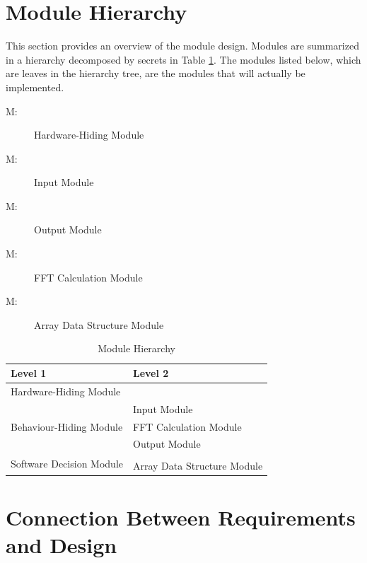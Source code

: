 \documentclass[12pt, titlepage]{article}
\newcounter{mnum}
\newcommand{\mthemnum}{M\themnum}
\begin{document}
\section{Module Hierarchy} \label{SecMH}

This section provides an overview of the module design. Modules are summarized
in a hierarchy decomposed by secrets in Table \ref{TblMH}. The modules listed
below, which are leaves in the hierarchy tree, are the modules that will
actually be implemented.

\begin{description}

\item [ \mthemnum \label{mHH}:] Hardware-Hiding Module
\item [ \mthemnum \label{mInput}:] Input  Module
\item [ \mthemnum \label{mOutput}:] Output  Module
\item [ \mthemnum \label{FFTcal}:] FFT Calculation Module
\item [ \mthemnum \label{mSeqDS}:] Array Data Structure Module
\end{description}


\begin{table}[h!]
\centering
\begin{tabular}{p{} p{}}
\toprule
\textbf{Level 1} & \textbf{Level 2}\\
\midrule

{Hardware-Hiding Module} & ~ \\
\midrule

\multirow{3}{0.3\textwidth}{Behaviour-Hiding Module}
& Input  Module\\
& FFT Calculation Module\\
& Output Module\\
\midrule

\multirow{3}{0.3\textwidth}{Software Decision Module}\\
& Array Data Structure Module\\
\bottomrule

\end{tabular}
\caption{Module Hierarchy}
\label{TblMH}
\end{table}

\section{Connection Between Requirements and Design} \label{SecConnection}
\end{document}
